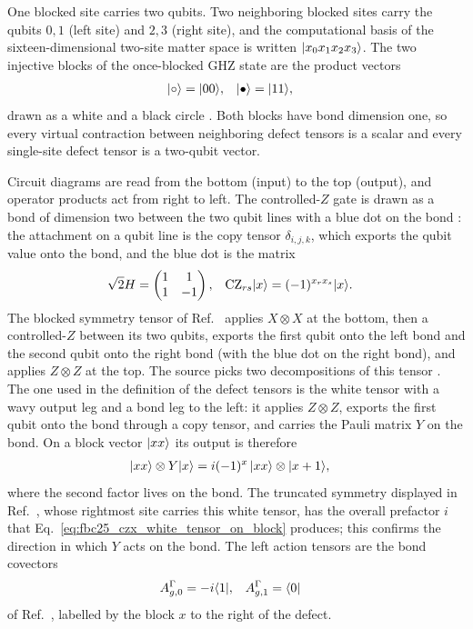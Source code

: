 \documentclass{article}
\begin{document}
One blocked site carries two qubits. Two neighboring blocked sites carry the
qubits $0,1$ (left site) and $2,3$ (right site), and the computational basis
of the sixteen-dimensional two-site matter space is written
$|x_0x_1x_2x_3\rangle$. The two injective blocks of the once-blocked GHZ state
are the product vectors
\begin{align}
    |\circ\rangle&=|00\rangle,
    &
    |\bullet\rangle&=|11\rangle,
    \label{eq:fbc25_czx_blocks}
\end{align}
drawn as a white and a black circle
\cite[lines~4660--4670]{FrancoRubio2025MPUGauging}. Both blocks have bond
dimension one, so every virtual contraction between neighboring defect
tensors is a scalar and every single-site defect tensor is a two-qubit
vector.

Circuit diagrams are read from the bottom (input) to the top (output), and
operator products act from right to left. The controlled-$Z$ gate is drawn
as a bond of dimension two between the two qubit lines with a blue dot on the
bond \cite[lines~3800--3845]{FrancoRubio2025MPUGauging}: the attachment on a
qubit line is the copy tensor $\delta_{i,j,k}$, which exports the qubit value
onto the bond, and the blue dot is the matrix
\begin{align}
    \sqrt2H
        &=\begin{pmatrix}1&1\\1&-1\end{pmatrix},
    &
    \mathrm{CZ}_{rs}|x\rangle
        &=(-1)^{x_rx_s}|x\rangle.
    \label{eq:fbc25_czx_cz_decomposition}
\end{align}
The blocked symmetry tensor  of
Ref.~\cite[lines~4505--4545]{FrancoRubio2025MPUGauging} applies $X\otimes X$
at the bottom, then a controlled-$Z$ between its two qubits, exports the
first qubit onto the left bond and the second qubit onto the right bond
(with the blue dot on the right bond), and applies $Z\otimes Z$ at the top.
The source picks two decompositions of this tensor
\cite[lines~4559--4659]{FrancoRubio2025MPUGauging}. The one used in the
definition of the defect tensors is the white tensor with a wavy output leg
and a bond leg to the left: it applies $Z\otimes Z$, exports the first qubit
onto the bond through a copy tensor, and carries the Pauli matrix $Y$ on the
bond. On a block vector $|xx\rangle$ its output is therefore
\begin{align}
    |xx\rangle\otimes Y|x\rangle
        &=i(-1)^{x}\,|xx\rangle\otimes|x+1\rangle,
    \label{eq:fbc25_czx_white_tensor_on_block}
\end{align}
where the second factor lives on the bond. The truncated symmetry displayed
in Ref.~\cite[lines~4700--4798]{FrancoRubio2025MPUGauging}, whose rightmost
site carries this white tensor, has the overall prefactor $i$ that
Eq.~\ref{eq:fbc25_czx_white_tensor_on_block} produces; this confirms the
direction in which $Y$ acts on the bond. The left action tensors are the
bond covectors
\begin{align}
    A^{\Gamma}_{g,0}&=-i\langle 1|,
    &
    A^{\Gamma}_{g,1}&=\langle 0|
    \label{eq:fbc25_czx_action_tensors}
\end{align}
of Ref.~\cite[lines~4690--4694]{FrancoRubio2025MPUGauging}, labelled by the
block $x$ to the right of the defect.
\end{document}
